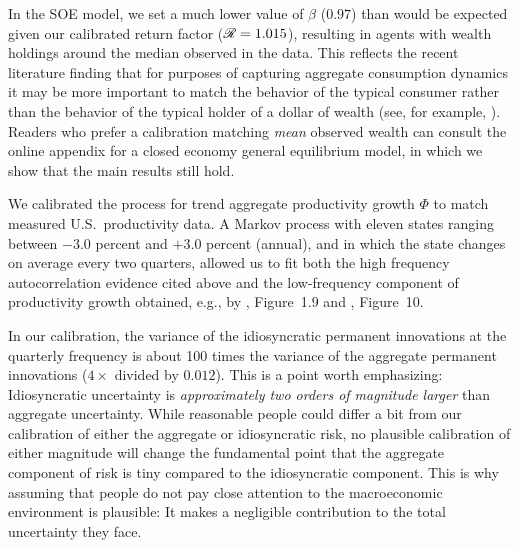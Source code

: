 \documentclass[titlepage]{./econtex}
\begin{document}
In the SOE model, we set a much lower value of $\beta$ ($ %
0.97 %
 $) than would be expected given our calibrated return factor (${\mathscr{R}} = 1.015$), resulting in agents with wealth holdings around the median observed in the data.  This reflects the recent literature finding that for purposes of capturing aggregate consumption dynamics it may be more important to match the behavior of the typical consumer rather than the behavior of the typical holder of a dollar of wealth (see, for example, \cite{opLiquidH2M}).  Readers who prefer a calibration matching \textit{mean} observed wealth can consult the online appendix for a closed economy general equilibrium model, in which we show that the main results still hold.

We calibrated the process for trend aggregate productivity growth $\Phi$ to match measured U.S.\ productivity data.  A Markov process with eleven states ranging between $-3.0$ percent and $+3.0$ percent (annual), and in which the state changes on average every two quarters, allowed us to fit both the high frequency autocorrelation evidence cited above and the low-frequency component of productivity growth obtained, e.g., by \cite{sswNAIRU}, Figure~1.9 and \cite{fernald:disappointingRecovery}, Figure~10.

In our calibration, the variance of the idiosyncratic permanent innovations at the quarterly frequency is about 100 times the variance of the aggregate permanent innovations ($4 \times $ divided by $%
0.012 %
 $).  This is a point worth emphasizing: Idiosyncratic uncertainty is {\it approximately two orders of magnitude larger} than aggregate uncertainty.  While reasonable people could differ a bit from our calibration of either the aggregate or idiosyncratic risk, no plausible calibration of either magnitude will change the fundamental point that the aggregate component of risk is tiny compared to the idiosyncratic component.  This is why assuming that people do not pay close attention to the macroeconomic environment is plausible: It makes a negligible contribution to the total uncertainty they face.
\end{document}
